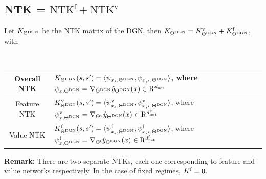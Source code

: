 \subsection{NTK = $\text{NTK}^{\text{f}}+ \text{NTK}^\text{v}$}

\begin{proposition}\label{prop:ntks} Let $K_{\Tdgn}$ be the NTK matrix of the DGN, then $K_{\Tdgn}=\kv_{\Tdgn}+\kf_{\Tdgn}$, with
\begin{table}[h]
\
\begin{tabular}{|c|p{6cm}|}\hline
Overall NTK & $K_{\Tdgn}(s,s')=\ip{\psi_{x_s,\Tdgn},\psi_{x_{s'},\Tdgn}}$, where $\psi_{x,\Tdgn}=\nabla_{\Tdgn}\hat{y}_{\Tdgn}(x)\in\R^{\dnet}$\\\hline
Feature NTK & $\kv_{\Tdgn}(s,s')=\ip{\psiv_{x_s,\Tdgn},\psiv_{x_{s'},\Tdgn}}$, where $\psiv_{x,\Tdgn}=\nabla_{\Tv}\hat{y}_{\Tdgn}(x)\in\R^{\dvnet}$\\\hline
Value NTK & $\kf_{\Tdgn}(s,s')=\ip{\psif_{x_s,\Tdgn},\psif_{x_{s'},\Tdgn}}$, where $\psif_{x,\Tdgn}=\nabla_{\Tf}\hat{y}_{\Tdgn}(x)\in\R^{\dfnet}$\\\hline
\end{tabular}

\end{table}
\end{proposition}
\textbf{Remark:} There are two separate NTKs, each one corresponding to feature and value networks respectively. In the case of fixed regimes, $\kf=0$. 
